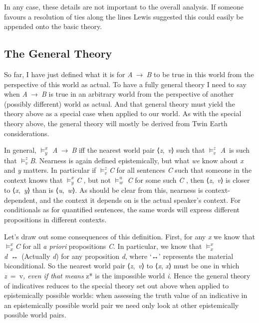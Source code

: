 \documentclass[
  10pt,
  letterpaper,
  DIV=11,
  numbers=noendperiod,
  twoside]{scrartcl}
\begin{document}
In any case, these details are not important to the overall analysis. If
someone favours a resolution of ties along the lines Lewis suggested
this could easily be appended onto the basic theory.

\subsection{The General Theory}\label{the-general-theory}

So far, I have just defined what it is for \emph{A}~→~\emph{B} to be
true in this world from the perspective of this world as actual. To have
a fully general theory I need to say when \emph{A}~→~\emph{B} is true in
an arbitrary world from the perspective of another (possibly different)
world as actual. And that general theory must yield the theory above as
a special case when applied to our world. As with the special theory
above, the general theory will mostly be derived from Twin Earth
considerations.

In general, \(\vDash_y^x\) \emph{A}~→~\emph{B} iff the nearest world
pair ⟨\emph{z},~\emph{v}⟩ such that \(\vDash_v^z\) \emph{A}~is such that
\(\vDash_v^z\)\emph{B}. Nearness is again defined epistemically, but
what \emph{we} know about \emph{x} and \emph{y} matters. In particular
if \(\vDash_v^z\)\emph{C} for all sentences \emph{C} such that someone
in the context knows that \(\vDash_y^x\)\emph{C} , but not
\(\vDash_w^u\) \emph{C} for some such \emph{C} , then
⟨\emph{z},~\emph{v}⟩ is closer to ⟨\emph{x},~\emph{y}⟩ than is
⟨\emph{u},~\emph{w}⟩. As should be clear from this, nearness is
context-dependent, and the context it depends on is the actual speaker's
context. For conditionals as for quantified sentences, the same words
will express different propositions in different contexts.

Let's draw out some consequences of this definition. First, for any
\emph{x} we know that \(\vDash_x^x\)\emph{C} for all \emph{a priori}
propositions \emph{C}. In particular, we know that
\(\vDash_x^x\)\emph{d}~↔~(Actually \emph{d}) for any proposition
\emph{d}, where `↔' represents the material biconditional. So the
nearest world pair ⟨\emph{z},~\emph{v}⟩ to ⟨\emph{x}, \emph{x}⟩ must be
one in which \emph{z}~=~v\emph{, even if that means }z* is the
impossible world \emph{i}. Hence the general theory of indicatives
reduces to the special theory set out above when applied to
epistemically possible worlds: when assessing the truth value of an
indicative in an epistemically possible world pair we need only look at
other epistemically possible world pairs.
\end{document}
